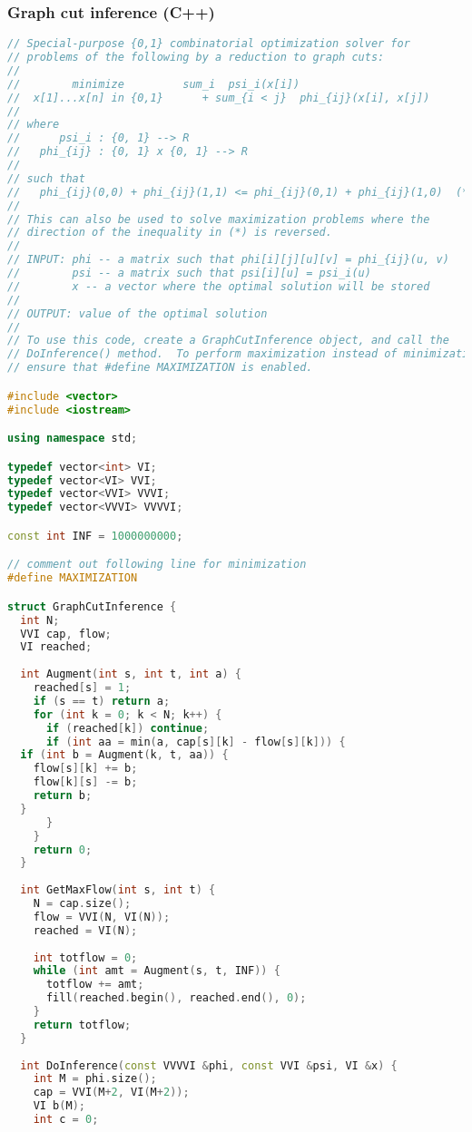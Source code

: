 \subsubsection{Graph cut inference (C++)}
\begin{lstlisting}[language=C++]
// Special-purpose {0,1} combinatorial optimization solver for
// problems of the following by a reduction to graph cuts:
//
//        minimize         sum_i  psi_i(x[i]) 
//  x[1]...x[n] in {0,1}      + sum_{i < j}  phi_{ij}(x[i], x[j])
//
// where
//      psi_i : {0, 1} --> R
//   phi_{ij} : {0, 1} x {0, 1} --> R
//
// such that
//   phi_{ij}(0,0) + phi_{ij}(1,1) <= phi_{ij}(0,1) + phi_{ij}(1,0)  (*)
//
// This can also be used to solve maximization problems where the
// direction of the inequality in (*) is reversed.
//
// INPUT: phi -- a matrix such that phi[i][j][u][v] = phi_{ij}(u, v)
//        psi -- a matrix such that psi[i][u] = psi_i(u)
//        x -- a vector where the optimal solution will be stored
//
// OUTPUT: value of the optimal solution
//
// To use this code, create a GraphCutInference object, and call the
// DoInference() method.  To perform maximization instead of minimization,
// ensure that #define MAXIMIZATION is enabled.

#include <vector>
#include <iostream>

using namespace std;

typedef vector<int> VI;
typedef vector<VI> VVI;
typedef vector<VVI> VVVI;
typedef vector<VVVI> VVVVI;

const int INF = 1000000000;

// comment out following line for minimization
#define MAXIMIZATION

struct GraphCutInference {
  int N;
  VVI cap, flow;
  VI reached;
  
  int Augment(int s, int t, int a) {
    reached[s] = 1;
    if (s == t) return a; 
    for (int k = 0; k < N; k++) {
      if (reached[k]) continue;
      if (int aa = min(a, cap[s][k] - flow[s][k])) {
  if (int b = Augment(k, t, aa)) {
    flow[s][k] += b;
    flow[k][s] -= b;
    return b;
  }
      }
    }
    return 0;
  }
  
  int GetMaxFlow(int s, int t) {
    N = cap.size();
    flow = VVI(N, VI(N));
    reached = VI(N);
    
    int totflow = 0;
    while (int amt = Augment(s, t, INF)) {
      totflow += amt;
      fill(reached.begin(), reached.end(), 0);
    }
    return totflow;
  }
  
  int DoInference(const VVVVI &phi, const VVI &psi, VI &x) {
    int M = phi.size();
    cap = VVI(M+2, VI(M+2));
    VI b(M);
    int c = 0;


\end{lstlisting}
